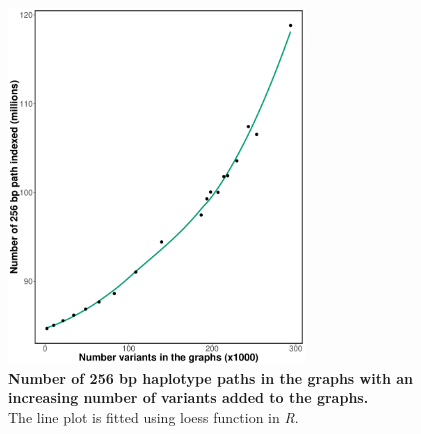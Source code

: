 \documentclass[../main.tex]{subfiles}
\begin{document}
\fi


\newpage

\setcounter{subsection}{0}
\renewcommand \thesubsection {Note S3.\arabic{subsection}}
\setcounter{figure}{0}
\renewcommand \thefigure {S3.\arabic{figure}}
\setcounter{table}{0}
\renewcommand \thetable {S3.\arabic{table}}

\begin{flushleft}
    
\begin{figure}[!htb]
    \centering
    \includegraphics[width=0.7\textwidth]{paper2/supplement/sp31.pdf}
    \caption[Number of 256 bp haplotype paths]{\textbf{Number of 256 bp haplotype paths in the graphs with an increasing
    number of variants added to the graphs.} \\
    \small{The line plot is fitted using loess function in \emph{R}.}}
    \label{sup_fig:s31}
\end{figure}


\newpage


\end{flushleft}
\end{document}
